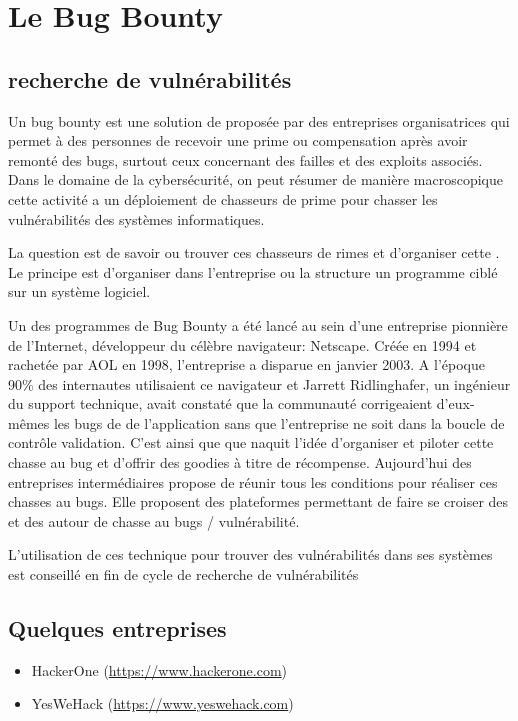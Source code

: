 \section{Le Bug Bounty}

\subsection{recherche de vulnérabilités}

Un bug bounty est une solution de  proposée par des entreprises organisatrices qui permet à des personnes de recevoir une prime ou compensation après avoir remonté des bugs, surtout ceux concernant des failles et des exploits associés. Dans le domaine de la cybersécurité, on peut résumer de manière macroscopique cette activité  a un déploiement de chasseurs de prime pour chasser les vulnérabilités  des systèmes informatiques.

La question est de savoir ou trouver ces chasseurs de rimes et d'organiser cette . Le principe est d'organiser dans l'entreprise ou la structure un programme ciblé sur un système logiciel.

Un des programmes de Bug Bounty  a été lancé au sein d’une entreprise pionnière de l'Internet, développeur du célèbre navigateur: Netscape. Créée en 1994 et rachetée par AOL en 1998, l’entreprise a disparue en janvier 2003.
A l'époque 90\% des internautes utilisaient ce navigateur et Jarrett Ridlinghafer, un ingénieur du support technique, avait constaté que la communauté  corrigeaient d’eux-mêmes les bugs de de l'application sans que l'entreprise ne soit dans la boucle de contrôle validation. C'est ainsi que que naquit l'idée d'organiser et piloter cette chasse au bug et d'offrir des goodies à titre de récompense. 
Aujourd'hui des entreprises intermédiaires propose de réunir tous les conditions pour réaliser ces chasses au bugs.
Elle proposent des plateformes permettant de faire se croiser des  et des  autour de chasse au bugs / vulnérabilité.

L'utilisation de ces technique pour trouver des vulnérabilités dans ses systèmes est conseillé en fin de cycle de recherche de vulnérabilités

\subsection{Quelques entreprises}

\begin{itemize}
    \item HackerOne (\url{https://www.hackerone.com})
    \item YesWeHack (\url{https://www.yeswehack.com})
\end{itemize}


